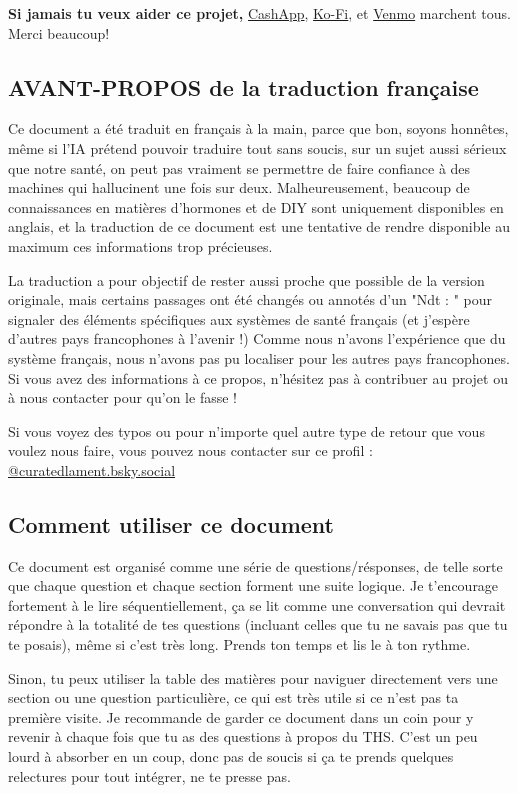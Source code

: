 \documentclass{article}
\begin{document}
\textbf{Si jamais tu veux aider ce projet,} \href{https://cash.app/Katitties}{CashApp}, \href{https://ko-fi.com/katitties}{Ko-Fi}, et \href{https://account.venmo.com/u/katitties}{Venmo} marchent tous. Merci beaucoup!

\subsection{AVANT-PROPOS de la traduction française}

Ce document a été traduit en français à la main, parce que bon, soyons honnêtes, même si l'IA prétend pouvoir traduire tout sans soucis, sur un sujet aussi sérieux que notre santé, on peut pas vraiment se permettre de faire confiance à des machines qui hallucinent une fois sur deux.
Malheureusement, beaucoup de connaissances en matières d'hormones et de DIY sont uniquement disponibles en anglais, et la traduction de ce document est une tentative de rendre disponible au maximum ces informations trop précieuses.

La traduction a pour objectif de rester aussi proche que possible de la version originale, mais certains passages ont été changés ou annotés d'un "Ndt : " pour signaler des éléments spécifiques aux systèmes de santé français (et j'espère d'autres pays francophones à l'avenir !)
Comme nous n'avons l'expérience que du système français, nous n'avons pas pu localiser pour les autres pays francophones. Si vous avez des informations à ce propos, n'hésitez pas à contribuer au projet ou à nous contacter pour qu'on le fasse !

Si vous voyez des typos ou pour n'importe quel autre type de retour que vous voulez nous faire, vous pouvez nous contacter sur ce profil : \href{https://bsky.app/profile/curatedlament.bsky.social}{@curatedlament.bsky.social}

\subsection*{Comment utiliser ce document}

Ce document est organisé comme une série de questions/résponses, de telle sorte que chaque question et chaque section forment une suite logique. Je t'encourage fortement à le lire séquentiellement, ça se lit comme une conversation qui devrait répondre à la totalité de tes questions (incluant celles que tu ne savais pas que tu te posais), même si c'est très long. Prends ton temps et lis le à ton rythme.

Sinon, tu peux utiliser la table des matières pour naviguer directement vers une section ou une question particulière, ce qui est très utile si ce n'est pas ta première visite. Je recommande de garder ce document dans un coin pour y revenir à chaque fois que tu as des questions à propos du THS. C'est un peu lourd à absorber en un coup, donc pas de soucis si ça te prends quelques relectures pour tout intégrer, ne te presse pas.
\end{document}
